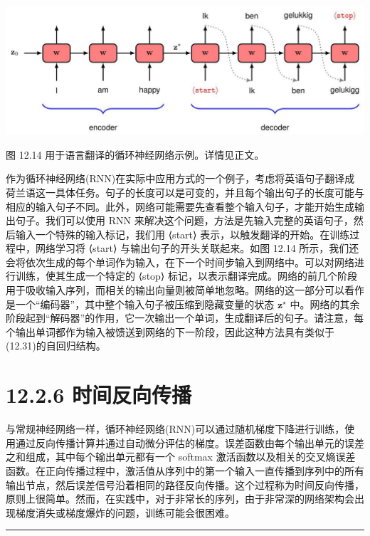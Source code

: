 \documentclass[10pt]{article}
\newcommand{\HRule}{\begin{center}\rule{0.9\linewidth}{0.2mm}\end{center}}
\begin{document}
\begin{center}
\includegraphics[max width=1.0\textwidth]{images/0194e279-9b28-703a-88f4-c3ac21e2010d_400_286_354_1245_448_0.jpg}
\end{center}
\hspace*{3em} 

图 12.14 用于语言翻译的循环神经网络示例。详情见正文。

作为循环神经网络(RNN)在实际中应用方式的一个例子，考虑将英语句子翻译成荷兰语这一具体任务。句子的长度可以是可变的，并且每个输出句子的长度可能与相应的输入句子不同。此外，网络可能需要先查看整个输入句子，才能开始生成输出句子。我们可以使用 RNN 来解决这个问题，方法是先输入完整的英语句子，然后输入一个特殊的输入标记，我们用 ⟨start⟩ 表示，以触发翻译的开始。在训练过程中，网络学习将 ⟨start⟩ 与输出句子的开头关联起来。如图 12.14 所示，我们还会将依次生成的每个单词作为输入，在下一个时间步输入到网络中。可以对网络进行训练，使其生成一个特定的 ⟨stop⟩ 标记，以表示翻译完成。网络的前几个阶段用于吸收输入序列，而相关的输出向量则被简单地忽略。网络的这一部分可以看作是一个“编码器”，其中整个输入句子被压缩到隐藏变量的状态 \({\mathbf{z}}^{ \star  }\) 中。网络的其余阶段起到“解码器”的作用，它一次输出一个单词，生成翻译后的句子。请注意，每个输出单词都作为输入被馈送到网络的下一阶段，因此这种方法具有类似于(12.31)的自回归结构。

\section*{12.2.6 时间反向传播}

与常规神经网络一样，循环神经网络(RNN)可以通过随机梯度下降进行训练，使用通过反向传播计算并通过自动微分评估的梯度。误差函数由每个输出单元的误差之和组成，其中每个输出单元都有一个 softmax 激活函数以及相关的交叉熵误差函数。在正向传播过程中，激活值从序列中的第一个输入一直传播到序列中的所有输出节点，然后误差信号沿着相同的路径反向传播。这个过程称为时间反向传播，原则上很简单。然而，在实践中，对于非常长的序列，由于非常深的网络架构会出现梯度消失或梯度爆炸的问题，训练可能会很困难。

\HRule
\end{document}
